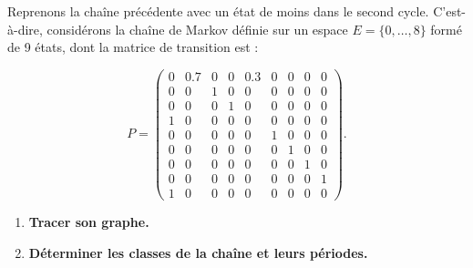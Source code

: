 \begin{exercise}[7.2]
Reprenons la chaîne précédente avec un état de moins dans le second cycle. C’est-à-dire, considérons la chaîne de Markov définie sur un espace $E = \{0, \dots, 8\}$ formé de 9 états, dont la matrice de transition est :

\[
P =
\begin{pmatrix}
0 & 0.7 & 0 & 0 & 0.3 & 0 & 0 & 0 & 0 \\
0 & 0 & 1 & 0 & 0 & 0 & 0 & 0 & 0 \\
0 & 0 & 0 & 1 & 0 & 0 & 0 & 0 & 0 \\
1 & 0 & 0 & 0 & 0 & 0 & 0 & 0 & 0 \\
0 & 0 & 0 & 0 & 0 & 1 & 0 & 0 & 0 \\
0 & 0 & 0 & 0 & 0 & 0 & 1 & 0 & 0 \\
0 & 0 & 0 & 0 & 0 & 0 & 0 & 1 & 0 \\
0 & 0 & 0 & 0 & 0 & 0 & 0 & 0 & 1 \\
1 & 0 & 0 & 0 & 0 & 0 & 0 & 0 & 0
\end{pmatrix}.
\]

\begin{enumerate}
    \item \textbf{Tracer son graphe.}
    \item \textbf{Déterminer les classes de la chaîne et leurs périodes.}
\end{enumerate}
\end{exercise}

